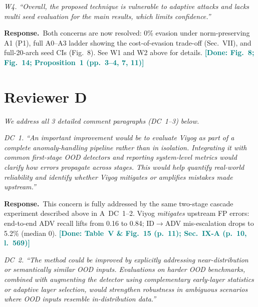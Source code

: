 \documentclass[10pt,letterpaper,journal]{IEEEtran}
\newcommand{\rc}[1]{\smallskip\noindent\textit{\textcolor{black!75}{#1}}\par\smallskip}
\newcommand{\rr}{\noindent\textbf{Response.}~}
\newcommand{\done}[1]{\textcolor{teal}{\textbf{[Done: #1]}}}
\begin{document}
\rc{W4. ``Overall, the proposed technique is vulnerable to adaptive attacks and
lacks multi seed evaluation for the main results, which limits confidence.''}

\rr Both concerns are now resolved: 0\% evasion under norm-preserving A1 (P1),
full A0--A3 ladder showing the cost-of-evasion trade-off (Sec.~VII), and
full-20-arch seed CIs (Fig.~8). See W1 and W2 above for details.
\done{Fig.~8; Fig.~14; Proposition~1 (pp.~3--4, 7, 11)}

\section*{Reviewer D}
\noindent\textit{We address all 3 detailed comment
paragraphs (DC~1--3) below.}

\rc{DC~1. ``An important improvement would be to evaluate Viyog as part of a
complete anomaly-handling pipeline rather than in isolation. Integrating it with
common first-stage OOD detectors and reporting system-level metrics would clarify
how errors propagate across stages. This would help quantify real-world reliability
and identify whether Viyog mitigates or amplifies mistakes made upstream.''}

\rr This concern is fully addressed by the same two-stage cascade experiment
described above in A~DC~1--2. Viyog \emph{mitigates} upstream
FP errors: end-to-end ADV recall lifts from 0.16 to 0.84; ID$\to$ADV
mis-escalation drops to 5.2\% (median 0).
\done{Table~V \& Fig.~15 (p.~11); Sec.~IX-A (p.~10, l.~569)}

\rc{DC~2. ``The method could be improved by explicitly addressing near-distribution
or semantically similar OOD inputs. Evaluations on harder OOD benchmarks, combined
with augmenting the detector using complementary early-layer statistics or adaptive
layer selection, would strengthen robustness in ambiguous scenarios where OOD inputs
resemble in-distribution data.''}
\end{document}

